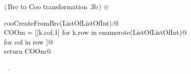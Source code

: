 \documentclass[11pt,oneside]{article}	%
\begin{document}
\begin{flushleft} \small
\begin{minipage}{\linewidth} \label{scrap2}
\protect{}$\langle\,$Brc to Coo transformation\nobreak\ {\footnotesize 3b}$\,\rangle\equiv$
\vspace{-1ex}
\begin{list}{}{} \item
\mbox{}\verb@def cooCreateFromBrc(ListOfListOfInt):@\\
\mbox{}\verb@    COOm = [[k,col,1] for k,row in enumerate(ListOfListOfInt)@\\
\mbox{}\verb@            for col in row ]@\\
\mbox{}\verb@    return COOm@\\
\mbox{}\verb@@{\NWsep}
\end{list}
\vspace{-1ex}
\footnotesize\addtolength{\baselineskip}{-1ex}
\begin{list}{}{\setlength{\itemsep}{-\parsep}\setlength{\itemindent}{-\leftmargin}}
\item \NWtxtMacroRefIn\ .
\end{list}
\end{minipage}\\[4ex]
\end{flushleft}
\end{document}
